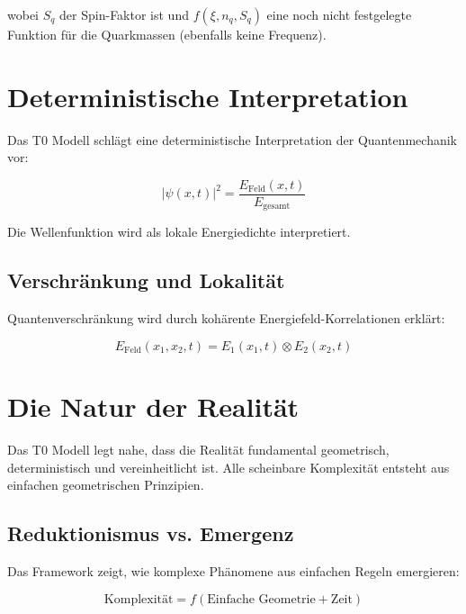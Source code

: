 	wobei $S_q$ der Spin-Faktor ist und $f(\xi, n_q, S_q)$ eine noch nicht festgelegte Funktion für die Quarkmassen (ebenfalls keine Frequenz).
	

	
	\section{Deterministische Interpretation}
	
	Das T0 Modell schlägt eine deterministische Interpretation der Quantenmechanik vor:
	
	\begin{equation}
		|\psi(x,t)|^2 = \frac{E_{\text{Feld}}(x,t)}{E_{\text{gesamt}}}
	\end{equation}
	
	Die Wellenfunktion wird als lokale Energiedichte interpretiert.
	
	\subsection{Verschränkung und Lokalität}
	
	Quantenverschränkung wird durch kohärente Energiefeld-Korrelationen erklärt:
	
	\begin{equation}
		E_{\text{Feld}}(x_1, x_2, t) = E_1(x_1,t) \otimes E_2(x_2,t)
	\end{equation}
	
	
	\section{Die Natur der Realität}
	
	\begin{erkenntnis}
		Das T0 Modell legt nahe, dass die Realität fundamental geometrisch, deterministisch und vereinheitlicht ist. Alle scheinbare Komplexität entsteht aus einfachen geometrischen Prinzipien.
	\end{erkenntnis}
	
	\subsection{Reduktionismus vs. Emergenz}
	
	Das Framework zeigt, wie komplexe Phänomene aus einfachen Regeln emergieren:
	
	\begin{equation}
		\text{Komplexität} = f(\text{Einfache Geometrie} + \text{Zeit})
	\end{equation}
	
